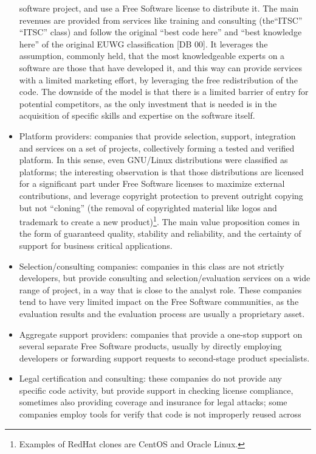 \begin{itemize}
software project, and use a Free Software license to distribute it. The main
revenues are provided from services like training and consulting (the“ITSC” ``ITSC'' class) and follow the original ``best code here'' and ``best knowledge here'' of the original EUWG classification [DB 00]. It leverages the assumption, commonly held, that the most knowledgeable experts on a software are those that have developed it, and this way can provide services with a limited marketing effort, by leveraging the free redistribution of the code. The downside of the model is that there is a limited barrier of entry for potential competitors, as the only investment that is needed is in the acquisition of specific skills and expertise on the software itself.
 \item Platform providers: companies that provide selection, support,
integration and services on a set of projects, collectively forming a tested and
verified platform. In this sense, even GNU/Linux distributions were classified
as platforms; the interesting observation is that those distributions are
licensed for a significant part under Free Software licenses to maximize
external contributions, and leverage copyright protection to prevent outright
copying but not ``cloning'' (the removal of copyrighted material like logos and
trademark to create a new product)\footnote{Examples of RedHat clones are CentOS
and Oracle Linux.}. The main value proposition comes in the
form of guaranteed quality, stability and reliability, and the certainty of
support for business critical applications.
 \item Selection/consulting companies: companies in this class are not strictly
developers, but provide consulting and selection/evaluation services on a wide
range of project, in a way that is close to the analyst role. These companies
tend to have very limited impact on the Free Software communities, as the
evaluation results and the evaluation process are usually a proprietary asset.
 \item Aggregate support providers: companies that provide a one-stop support on
several separate Free Software products, usually by directly employing
developers or forwarding support requests to second-stage product specialists.
 \item Legal certification and consulting: these companies do not provide any
specific code activity, but provide support in checking license compliance,
sometimes also providing coverage and insurance for legal attacks; some
companies employ tools for verify that code is not improperly reused across

\end{itemize}
